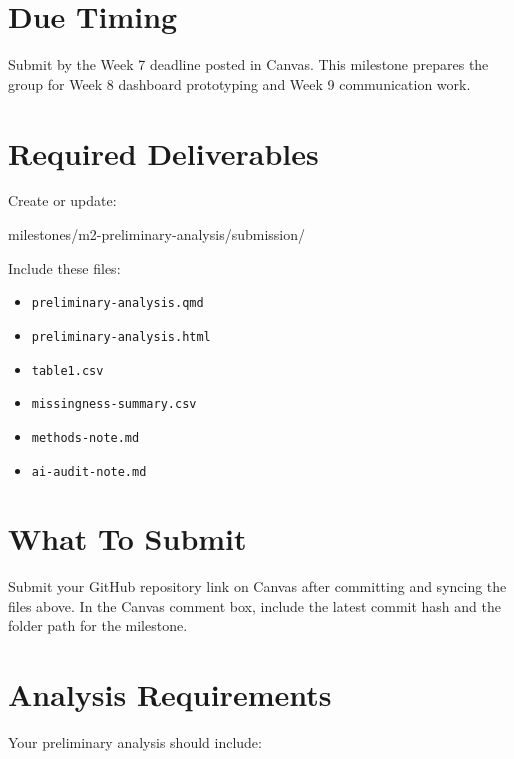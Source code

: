 \documentclass[
  letterpaper,
  DIV=11,
  numbers=noendperiod,
  oneside]{scrreprt}
\newenvironment{Shaded}{\begin{snugshade}}{\end{snugshade}}
\newcommand{\NormalTok}[1]{\textcolor[rgb]{0.00,0.23,0.31}{#1}}
\providecommand{\tightlist}{%
  \setlength{\itemsep}{0pt}\setlength{\parskip}{0pt}}
\begin{document}
\section{Due Timing}\label{due-timing-2}

Submit by the Week 7 deadline posted in Canvas. This milestone prepares
the group for Week 8 dashboard prototyping and Week 9 communication
work.

\section{Required Deliverables}\label{required-deliverables-2}

Create or update:

\begin{Shaded}
\begin{Highlighting}[numbers=left,,]
\NormalTok{milestones/m2{-}preliminary{-}analysis/submission/}
\end{Highlighting}
\end{Shaded}

Include these files:

\begin{itemize}
\tightlist
\item
  \texttt{preliminary-analysis.qmd}
\item
  \texttt{preliminary-analysis.html}
\item
  \texttt{table1.csv}
\item
  \texttt{missingness-summary.csv}
\item
  \texttt{methods-note.md}
\item
  \texttt{ai-audit-note.md}
\end{itemize}

\section{What To Submit}\label{what-to-submit-2}

Submit your GitHub repository link on Canvas after committing and
syncing the files above. In the Canvas comment box, include the latest
commit hash and the folder path for the milestone.

\section{Analysis Requirements}\label{analysis-requirements}

Your preliminary analysis should include:
\end{document}
